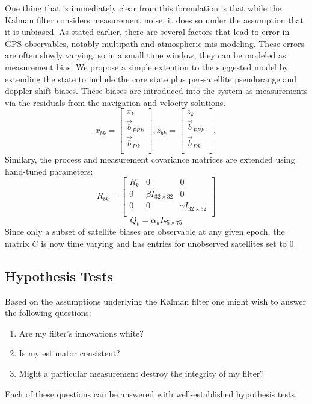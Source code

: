 One thing that is immediately clear from this formulation is that while the Kalman filter considers measurement noise, it does so under the assumption that it is unbiased.  As stated earlier, there are several factors that lead to error in GPS observables, notably multipath and atmospheric mis-modeling.  These errors are often slowly varying, so in a small time window, they can be modeled as measurement bias.  We propose a simple extention to the suggested model by extending the state to include the core state plus per-satellite pseudorange and doppler shift biases.  These biases are introduced into the system as measurements via the residuals from the navigation and velocity solutions.
\begin{equation}
x_{bk} = \left[
\begin{array}{c}
x_k\\
\vec{b}_{PRk}\\
\vec{b}_{Dk}\\
\end{array}
\right],
z_{bk} = \left[
\begin{array}{c}
z_k\\
\vec{b}_{PRk}\\
\vec{b}_{Dk}\\
\end{array}
\right],
\end{equation}
Similary, the process and measurement covariance matrices are extended using hand-tuned parameters:
\begin{equation}
R_{bk} = \left[
\begin{array}{ccc}
R_k & 0 & 0\\
0 & \beta I_{32\times32} & 0\\
0 & 0 & \gamma I_{32\times32}\\
\end{array}
\right]
\end{equation}
\[Q_b = \alpha_k I_{75\times75}\]
Since only a subset of satellite biases are observable at any given epoch, the matrix $C$ is now time varying and has entries for unobserved satellites set to $0$.

\subsection{Hypothesis Tests}
Based on the assumptions underlying the Kalman filter one might wish to answer the following questions:
\begin{enumerate}
\item Are my filter's innovations white?
\item Is my estimator consistent?
\item Might a particular measurement destroy the integrity of my filter?
\end{enumerate}
Each of these questions can be answered with well-established hypothesis tests.

